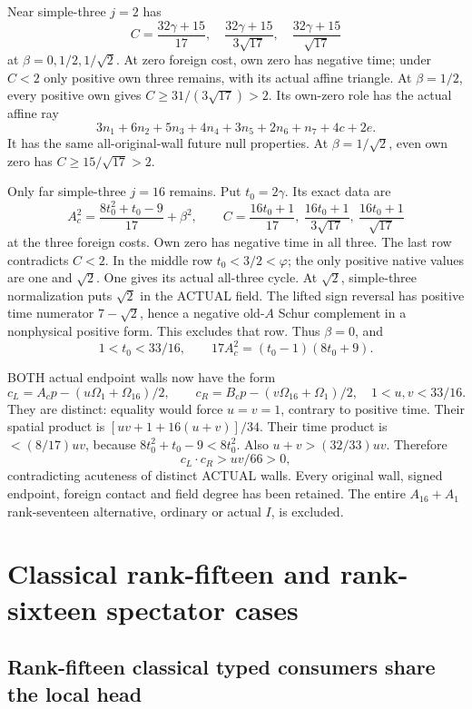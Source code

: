 \documentclass[11pt]{article}
\begin{document}
Near simple-three \(j=2\) has
\[
 C={\frac{32\gamma+15}{17}},\quad
   {\frac{32\gamma+15}{3\sqrt{17}}},\quad
   {\frac{32\gamma+15}{\sqrt{17}}}
\]
at \(\beta=0,1/2,1/\sqrt2\).
At zero foreign cost, own zero has
negative time; under \(C<2\) only
positive own three remains, with its
actual affine triangle.
At \(\beta=1/2\), every positive own
gives \(C\ge31/(3\sqrt{17})>2\).
Its own-zero role has the actual
affine ray
\[
                 3n_1+6n_2+5n_3+4n_4+3n_5+2n_6+n_7+4c+2e .
\]
It has the same all-original-wall future
null properties.
At \(\beta=1/\sqrt2\), even own zero
has \(C\ge15/\sqrt{17}>2\).

Only far simple-three \(j=16\) remains.
Put \(t_0=2\gamma\).
Its exact data are
\[
 A_c^2={\frac{8t_0^2+t_0-9}{17}}+\beta^2,\qquad
 C={\frac{16t_0+1}{17}},\
   {\frac{16t_0+1}{3\sqrt{17}}},\
   {\frac{16t_0+1}{\sqrt{17}}}
\]
at the three foreign costs.
Own zero has negative time in all three.
The last row contradicts \(C<2\).
In the middle row \(t_0<3/2<\varphi\);
the only positive native values are one
and \(\sqrt2\).
One gives its actual all-three cycle.
At \(\sqrt2\), simple-three normalization
puts \(\sqrt2\) in the ACTUAL field.
The lifted sign reversal has positive
time numerator \(7-\sqrt2\), hence a
negative old-\(A\) Schur complement in
a nonphysical positive form.
This excludes that row.
Thus \(\beta=0\), and
\[
                    1<t_0<33/16,\qquad
                    17A_c^2=(t_0-1)(8t_0+9).
\]

BOTH actual endpoint walls now have the form
\[
 c_L=A_cp-(u\Omega_1+\Omega_{16})/2,\qquad
 c_R=B_cp-(v\Omega_{16}+\Omega_1)/2,
                \quad1<u,v<33/16 .
\]
They are distinct: equality would force
\(u=v=1\), contrary to positive time.
Their spatial product is
\([uv+1+16(u+v)]/34\).
Their time product is \(<(8/17)uv\),
because \(8t_0^2+t_0-9<8t_0^2\).
Also \(u+v>(32/33)uv\).
Therefore
\[
                           c_L\cdot c_R>uv/66>0 ,
\]
contradicting acuteness of distinct ACTUAL
walls.
Every original wall, signed endpoint,
foreign contact and field degree has
been retained.
The entire \(A_{16}+A_1\) rank-seventeen
alternative, ordinary or actual \(I\),
is excluded.

\section{Classical rank-fifteen and rank-sixteen spectator cases}
\label{app:arithclassicalspectators}
\subsection{Rank-fifteen classical typed consumers share the local head}
\label{app:arithBD15typed}
\end{document}
